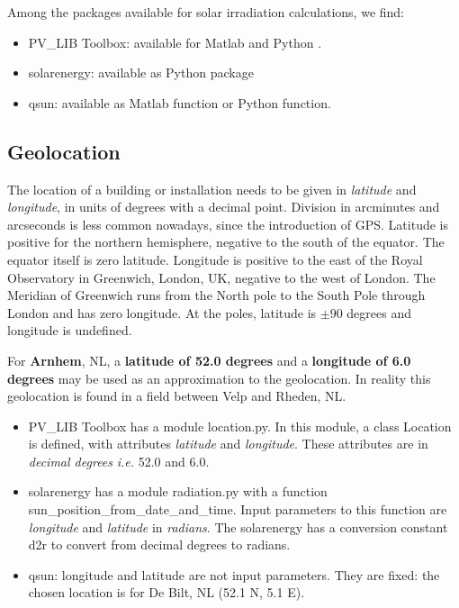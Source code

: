 Among the packages available for solar irradiation calculations, we find:

\begin{itemize}
	\item \textsf{PV\_LIB Toolbox}: available for Matlab and Python \cite{PV_LIB_main, PV_LIB_Python, PV_LIB_ReadTheDocs, PV_LIB_GitHub}.
	\item \textsf{solarenergy}: available as Python package \cite{SolarEnergy_ReadTheDocs, SolarEnergy_GitHub}
	\item \textsf{qsun}: available as Matlab function or Python function.
\end{itemize}

\subsection{Geolocation}

The location of a building or installation needs to be given in \emph{latitude} and \emph{longitude}, in units of degrees with a decimal point. Division in arcminutes and arcseconds is less common nowadays, since the introduction of GPS. Latitude is positive for the northern hemisphere, negative to the south of the equator. The equator itself is zero latitude. Longitude is positive to the east of the Royal Observatory in Greenwich, London, UK, negative to the west of London. The Meridian of Greenwich runs from the North pole to the South Pole through London and has zero longitude. At the poles, latitude is $\pm 90$ degrees and longitude is undefined.

For \textbf{Arnhem}, NL, a \textbf{latitude of 52.0 degrees} and a \textbf{longitude of 6.0 degrees} may be used as an approximation to the geolocation. In reality this geolocation is found in a field between Velp and Rheden, NL.

\begin{itemize}
	\item \textsf{PV\_LIB Toolbox} has a  module \textsf{location.py}. In this module, a class \textsf{Location} is defined, with attributes  \emph{latitude} and \emph{longitude}. These attributes are in \emph{decimal degrees} \textit{i.e.} 52.0 and 6.0. 
	\item \textsf{solarenergy} has a module \textsf{radiation.py} with  a function \textsf{sun\_position\_from\_date\_and\_time}. Input parameters to this function are \emph{longitude} and \emph{latitude} in \emph{radians}. The \textsf{solarenergy} has a conversion constant \textsf{d2r} to convert from decimal degrees to radians. 
	\item \textsf{qsun}: longitude and latitude are not input parameters. They are fixed: the chosen location is for De Bilt, NL (52.1 N, 5.1 E).
\end{itemize}

